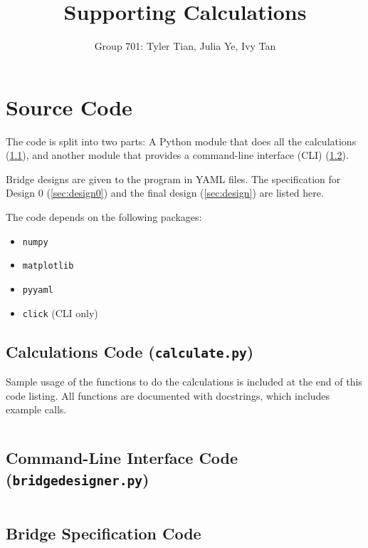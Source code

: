 \documentclass{article}
\title{Supporting Calculations}
\author{Group 701: Tyler Tian, Julia Ye, Ivy Tan}
\begin{document}
\maketitle
\sloppy

\section{Source Code}

The code is split into two parts: A Python module that does all the calculations (\ref{sec:calc}), and another module
that provides a command-line interface (CLI) (\ref{sec:cli}).

Bridge designs are given to the program in YAML files. The specification for Design 0 (\ref{sec:design0}) and the final
design (\ref{sec:design}) are listed here.

The code depends on the following packages:
\begin{itemize}
    \setlength\itemsep{0em}
    \item \texttt{numpy}
    \item \texttt{matplotlib}
    \item \texttt{pyyaml}
    \item \texttt{click} (CLI only)
\end{itemize}

\subsection{Calculations Code (\texttt{calculate.py})}
\label{sec:calc}

Sample usage of the functions to do the calculations is included at the end of this code listing. All functions are
documented with docstrings, which includes example calls.

\inputminted[linenos, breaklines, fontsize=\small]{python}{../../calculate.py}
\pagebreak

\subsection{Command-Line Interface Code (\texttt{bridgedesigner.py})}
\label{sec:cli}

\inputminted[linenos, breaklines, fontsize=\small]{python}{../../bridgedesigner.py}
\pagebreak

\subsection{Bridge Specification Code}
\end{document}
